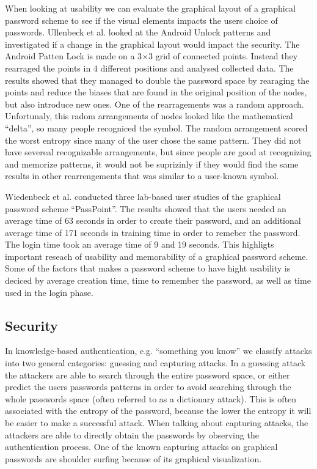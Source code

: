   When looking at usability we can evaluate the graphical layout of a graphical password scheme to see if the visual elements impacts the users choice of passwords. Ullenbeck et al. \cite{Uellenbeck} looked at the Android Unlock patterns and investigated if a change in the graphical layout would impact the security. The Android Patten Lock is made on a 3$\times$3 grid of connected points. Instead they rearraged the points in 4 different positions and analysed collected data. The results showed that they managed to double the password space by rearaging the points and reduce the biases that are found in the original position of the nodes, but also introduce new ones. One of the rearragements was a random approach. Unfortunaly, this radom arrangements of nodes looked like the mathematical ``delta'', so many people recogniced the symbol. The random arrangement scored the worst entropy since many of the user chose the same pattern. They did not have severeal recognizable arrangements, but since people are good at recognizing and memorize patterns, it would not be suprizinly if they would find the same results in other rearrengements that was similar to a user-known symbol.  

  Wiedenbeck et al. \cite{Wiedenbeck1, Wiedenbeck2, Wiedenbeck3} conducted three lab-based user studies of the graphical password scheme ``PassPoint''. The results showed that the users needed an average time of 63 seconds in order to create their password, and an additional average time of 171 seconds in training time in order to remeber the password. The login time took an average time of 9 and 19 seconds. This highligts important reseach of usability and memorability of a graphical password scheme. Some of the factors that makes a password scheme to have hight usability is deciced by average creation time, time to remember the password, as well as time used in the login phase. 


    
\subsection{Security}

  In knowledge-based authentication, e.g. ``something you know'' we classify attacks into two general categories: guessing and capturing attacks. In a guessing attack the attackers are able to search through the entire password space, or either predict the users passwords patterns in order to avoid searching through the whole passwords space (often referred to as a dictionary attack). This is often associated with the entropy of the password, because the lower the entropy it will be easier to make a successful attack. When talking about capturing attacks, the attackers are able to directly obtain the passwords by observing the authentication process. One of the known capturing attacks on graphical passwords are shoulder surfing because of its graphical visualization.  

